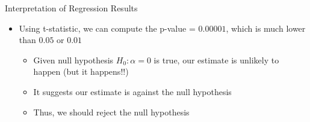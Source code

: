 \documentclass[dvipsnames,hyperref={pdfpagelabels=false}]{beamer}
\begin{document}
\begin{frame}{Interpretation of Regression Results}
\begin{itemize} 
\item Using t-statistic, we can compute the p-value = $0.00001$, which is much lower than $0.05$ or $0.01$
	\vspace{0.3cm}
	\begin{itemize} 
		
\item Given null hypothesis $H_0: \alpha=0$ is true, our estimate is unlikely to happen (but it happens!!) 		
			\vspace{0.3cm}
\item It suggests our estimate is against the null hypothesis
			\vspace{0.3cm}
\item Thus, we should reject the null hypothesis
\end{itemize}

\end{itemize}



\end{frame}




%	
%		
%		
%		
%		
\end{document}
